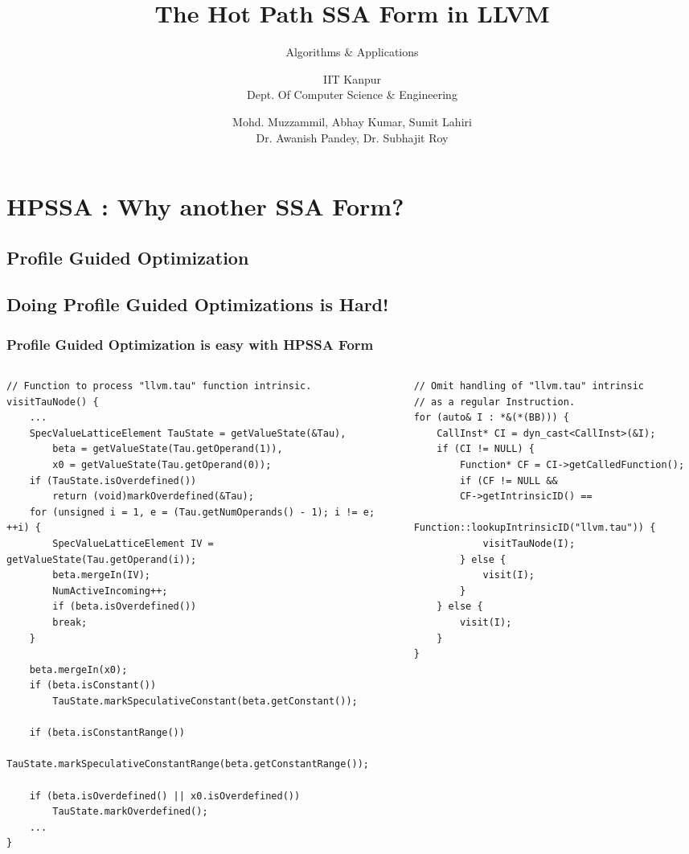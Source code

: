 \documentclass[aspectratio=169]{beamer}
\title[\url{https://google.com}] %
{The Hot Path SSA Form in LLVM}
\subtitle{Algorithms \& Applications}
\author[VIP1 \& VIP2] %
{IIT Kanpur \\ Dept. Of Computer Science \& Engineering}
\institute[IDK] %
{
	\inst{1}%
	IIT Kanpur\\
	PRAISE Group
}
\date[01/03/2022] %
{Mohd. Muzzammil, Abhay Kumar, Sumit Lahiri \\ Dr. Awanish Pandey, Dr. Subhajit Roy}
\begin{document}
\frame{\titlepage}

\footnotesize
\section{HPSSA : Why another SSA Form?}
\subsection{Profile Guided Optimization}
{
	
}
\subsection{Doing Profile Guided Optimizations is Hard!}
{
	
}
\begin{frame}[fragile]
	\frametitle{Profile Guided Optimization is easy with HPSSA Form}
	\begin{columns}
		\begin{column}{0.3\textwidth}
	\begin{verbatim}
// Function to process "llvm.tau" function intrinsic.
visitTauNode() {
	...
	SpecValueLatticeElement TauState = getValueState(&Tau), 
		beta = getValueState(Tau.getOperand(1)), 
		x0 = getValueState(Tau.getOperand(0));
	if (TauState.isOverdefined())
		return (void)markOverdefined(&Tau);
	for (unsigned i = 1, e = (Tau.getNumOperands() - 1); i != e; ++i) {
		SpecValueLatticeElement IV = getValueState(Tau.getOperand(i));
		beta.mergeIn(IV);
		NumActiveIncoming++;
		if (beta.isOverdefined())
		break;
	}
	
	beta.mergeIn(x0);
	if (beta.isConstant())
		TauState.markSpeculativeConstant(beta.getConstant());
	
	if (beta.isConstantRange())
		TauState.markSpeculativeConstantRange(beta.getConstantRange());
	
	if (beta.isOverdefined() || x0.isOverdefined())
		TauState.markOverdefined();
	...
}
\end{verbatim}
		\end{column}
	\begin{column}{0.1\textwidth} \end{column}
		\begin{column}{0.3\textwidth}  
			\begin{verbatim}
// Omit handling of "llvm.tau" intrinsic 
// as a regular Instruction.
for (auto& I : *&(*(BB))) {
	CallInst* CI = dyn_cast<CallInst>(&I);
	if (CI != NULL) {
		Function* CF = CI->getCalledFunction();
		if (CF != NULL &&
		CF->getIntrinsicID() == 
			Function::lookupIntrinsicID("llvm.tau")) {
			visitTauNode(I);
		} else {
			visit(I);
		} 
	} else {
		visit(I);
	}
}
			\end{verbatim}
		\end{column}
	\end{columns}
\end{frame}
\end{document}
